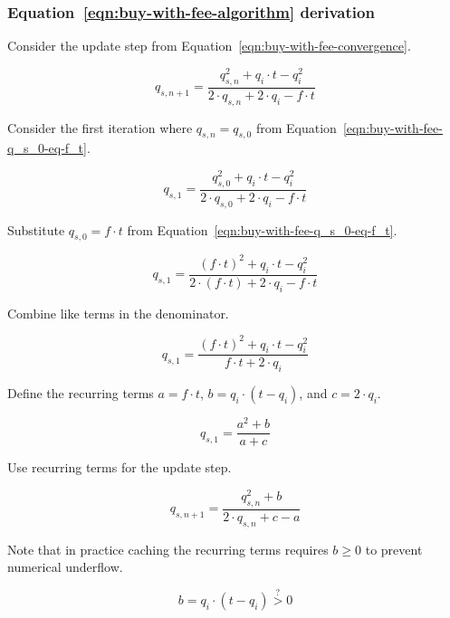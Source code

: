\subsubsection{Equation~\ref{eqn:buy-with-fee-algorithm} derivation}%
\label{sssec:equation-eqn-buy-with-fee-algorithm-derivation}

Consider the update step from Equation~\ref{eqn:buy-with-fee-convergence}.

\begin{equation*}
	q_{s, n + 1} = \frac{q_{s, n}^2 + q_i \cdot t - q_i^2}
	{2 \cdot q_{s, n} + 2 \cdot q_i - f \cdot t}
\end{equation*}

Consider the first iteration where $q_{s, n} = q_{s, 0}$ from
Equation~\ref{eqn:buy-with-fee-q_s_0-eq-f_t}.

\begin{equation*}
	q_{s, 1} = \frac{q_{s, 0}^2 + q_i \cdot t - q_i^2}
	{2 \cdot q_{s, 0} + 2 \cdot q_i - f \cdot t}
\end{equation*}

Substitute $q_{s, 0} = f \cdot t$ from Equation~\ref{eqn:buy-with-fee-q_s_0-eq-f_t}.

\begin{equation*}
	q_{s, 1} = \frac{{(f \cdot t)}^2 + q_i \cdot t - q_i^2}
	{2 \cdot (f \cdot t) + 2 \cdot q_i - f \cdot t}
\end{equation*}

Combine like terms in the denominator.

\begin{equation*}
	q_{s, 1} = \frac{{(f \cdot t)}^2 + q_i \cdot t - q_i^2}{f \cdot t + 2 \cdot q_i}
\end{equation*}

Define the recurring terms $a = f \cdot t$, $b = q_i \cdot (t - q_i)$, and
$c = 2 \cdot q_i$.

\begin{equation*}
	q_{s, 1} = \frac{a^2 + b}{a + c}
\end{equation*}

Use recurring terms for the update step.

\begin{equation*}
	q_{s, n + 1} = \frac{q_{s, n}^2 + b}{2 \cdot q_{s, n} + c - a}
\end{equation*}

Note that in practice caching the recurring terms requires $b \geq 0$ to prevent
numerical underflow.

\begin{equation*}
	b = q_i \cdot (t - q_i) \stackrel{?}{>} 0
\end{equation*}

